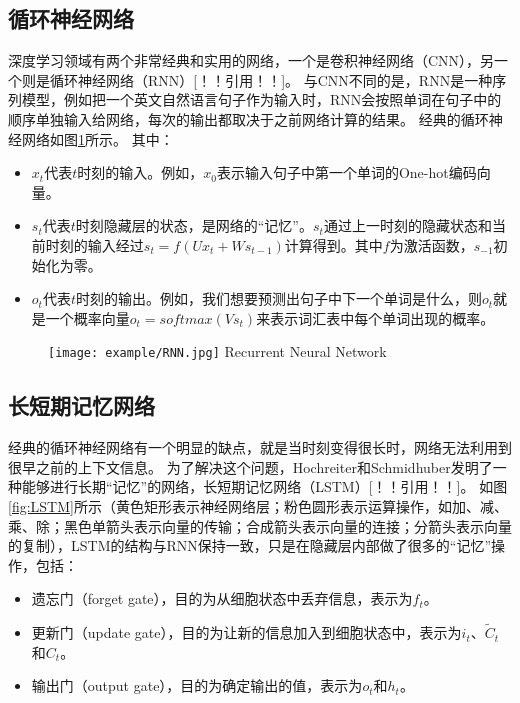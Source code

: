 \subsection{循环神经网络}

深度学习领域有两个非常经典和实用的网络，一个是卷积神经网络（CNN），另一个则是循环神经网络（RNN）[！！引用！！]。
与CNN不同的是，RNN是一种序列模型，例如把一个英文自然语言句子作为输入时，RNN会按照单词在句子中的顺序单独输入给网络，每次的输出都取决于之前网络计算的结果。
经典的循环神经网络如图\ref{fig:RNN}所示。
其中：
\begin{itemize}
  \item $x_t$代表$t$时刻的输入。例如，$x_0$表示输入句子中第一个单词的One-hot编码向量。
  \item $s_t$代表$t$时刻隐藏层的状态，是网络的“记忆”。$s_t$通过上一时刻的隐藏状态和当前时刻的输入经过$s_t = f(Ux_t + Ws_{t-1})$计算得到。其中$f$为激活函数，$s_{-1}$初始化为零。
  \item $o_t$代表$t$时刻的输出。例如，我们想要预测出句子中下一个单词是什么，则$o_t$就是一个概率向量$o_t = softmax(Vs_t)$来表示词汇表中每个单词出现的概率。
\end{itemize}

\begin{figure}[!htp]
  \centering
  \texttt{[image: example/RNN.jpg]}
    {Recurrent Neural Network}
  \label{fig:RNN}
\end{figure}

\subsection{长短期记忆网络}

经典的循环神经网络有一个明显的缺点，就是当时刻变得很长时，网络无法利用到很早之前的上下文信息。
为了解决这个问题，Hochreiter和Schmidhuber发明了一种能够进行长期“记忆”的网络，长短期记忆网络（LSTM）[！！引用！！]。
如图\ref{fig:LSTM}所示（黄色矩形表示神经网络层；粉色圆形表示运算操作，如加、减、乘、除；黑色单箭头表示向量的传输；合成箭头表示向量的连接；分箭头表示向量的复制），LSTM的结构与RNN保持一致，只是在隐藏层内部做了很多的“记忆”操作，包括：

\begin{itemize}
   \item 遗忘门（forget gate），目的为从细胞状态中丢弃信息，表示为$f_t$。
   \item 更新门（update gate），目的为让新的信息加入到细胞状态中，表示为$i_t$、$\widetilde{C}_t$和$C_t$。
   \item 输出门（output gate），目的为确定输出的值，表示为$o_t$和$h_t$。
\end{itemize}

